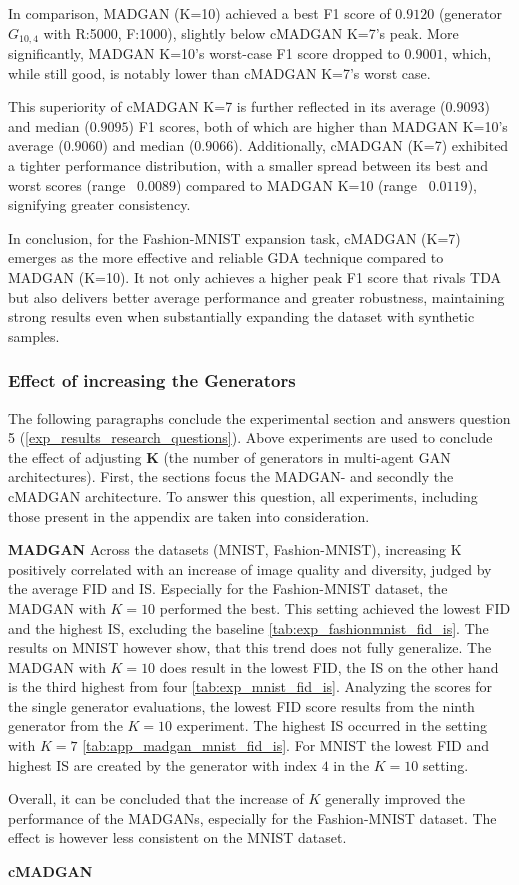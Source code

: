 In comparison, MADGAN (K=10) achieved a best F1 score of $0.9120$ (generator \(G_{10,4}\) with R:5000, F:1000), slightly below cMADGAN K=7's peak. More significantly, MADGAN K=10's worst-case F1 score dropped to $0.9001$, which, while still good, is notably lower than cMADGAN K=7's worst case.

This superiority of cMADGAN K=7 is further reflected in its average ($0.9093$) and median ($0.9095$) F1 scores, both of which are higher than MADGAN K=10's average ($0.9060$) and median ($0.9066$). Additionally, cMADGAN (K=7) exhibited a tighter performance distribution, with a smaller spread between its best and worst scores (range ~$0.0089$) compared to MADGAN K=10 (range ~$0.0119$), signifying greater consistency.

In conclusion, for the Fashion-MNIST expansion task, cMADGAN (K=7) emerges as the more effective and reliable GDA technique compared to MADGAN (K=10). It not only achieves a higher peak F1 score that rivals TDA but also delivers better average performance and greater robustness, maintaining strong results even when substantially expanding the dataset with synthetic samples.

\subsubsection[Question 5]{Effect of increasing the Generators}            \label{exp_results_ans_q5}
The following paragraphs conclude the experimental section and answers question 5 (\ref{exp_results_research_questions}). Above experiments are used to conclude the effect of adjusting \textbf{K} (the number of generators in multi-agent GAN architectures). First, the sections focus the MADGAN- and secondly the cMADGAN architecture. To answer this question, all experiments, including those present in the appendix are taken into consideration.


\noindent\textbf{MADGAN}
Across the datasets (MNIST, Fashion-MNIST), increasing K positively correlated with an increase of image quality and diversity, judged by the average FID and IS. Especially for the Fashion-MNIST dataset, the MADGAN with $K=10$ performed the best. This setting achieved the lowest FID and the highest IS, excluding the baseline \ref{tab:exp_fashionmnist_fid_is}. The results on MNIST however show, that this trend does not fully generalize. The MADGAN with $K=10$ does result in the lowest FID, the IS on the other hand is the third highest from four \ref{tab:exp_mnist_fid_is}. Analyzing the scores for the single generator evaluations, the lowest FID score results from the ninth generator from the $K=10$ experiment. The highest IS occurred in the setting with $K=7$ \ref{tab:app_madgan_mnist_fid_is}. For MNIST the lowest FID and highest IS are created by the generator with index $4$ in the $K=10$ setting. 

Overall, it can be concluded that the increase of $K$ generally improved the performance of the MADGANs, especially for the Fashion-MNIST dataset. The effect is however less consistent on the MNIST dataset. 

\noindent\textbf{cMADGAN}



\newpage
